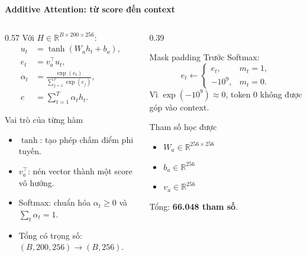 \documentclass[aspectratio=169]{beamer}
\begin{document}
\begin{frame}{\textbf{\large Additive Attention: từ score đến context}}
    \begin{columns}[T,onlytextwidth]
        \begin{column}{0.57\textwidth}
            \small
            Với $H\in\mathbb{R}^{B\times200\times256}$:
            \begin{align*}
                u_t &= \tanh(W_ah_t+b_a),\\
                e_t &= v_a^\top u_t,\\
                \alpha_t &= \frac{\exp(e_t)}
                {\sum_{j=1}^{T}\exp(e_j)},\\
                c &= \sum_{t=1}^{T}\alpha_t h_t.
            \end{align*}

            \begin{block}{Vai trò của từng hàm}
                \begin{itemize}
                    \item $\tanh$: tạo phép chấm điểm phi tuyến.
                    \item $v_a^\top$: nén vector thành một score vô hướng.
                    \item Softmax: chuẩn hóa $\alpha_t\ge0$ và
                    $\sum_t\alpha_t=1$.
                    \item Tổng có trọng số: $(B,200,256)\rightarrow(B,256)$.
                \end{itemize}
            \end{block}
        \end{column}

        \begin{column}{0.39\textwidth}
            \begin{alertblock}{Mask padding}
                Trước Softmax:
                \[
                    e_t\leftarrow
                    \begin{cases}
                        e_t,&m_t=1,\\
                        -10^9,&m_t=0.
                    \end{cases}
                \]
                Vì $\exp(-10^9)\approx0$, token 0 không được góp vào context.
            \end{alertblock}

            \begin{block}{Tham số học được}
                \begin{itemize}
                    \item $W_a\in\mathbb{R}^{256\times256}$
                    \item $b_a\in\mathbb{R}^{256}$
                    \item $v_a\in\mathbb{R}^{256}$
                \end{itemize}
                Tổng: \textbf{66.048 tham số}.
            \end{block}
        \end{column}
    \end{columns}
\end{frame}
\end{document}
